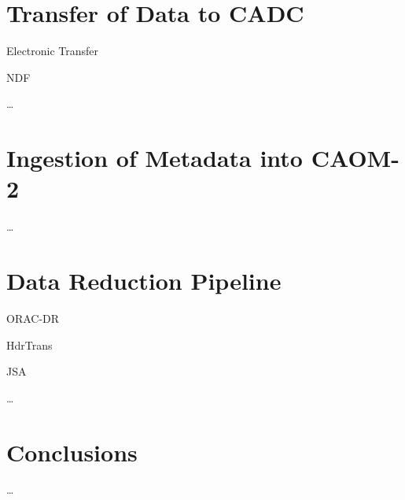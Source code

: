 \documentclass[11pt,twoside]{article}
\begin{document}
\section{Transfer of Data to CADC}

Electronic Transfer \citep{2005ASPC..347..647M}

NDF \citep{P91_adassxxiii}

\ldots

\section{Ingestion of Metadata into CAOM-2}

\ldots

\section{Data Reduction Pipeline}

ORAC-DR \citep{1999ASPC..172...11E,2008AN....329..295C}

HdrTrans \citep[section 2.2]{2008AN....329..295C}

JSA \citep{2011ASPC..442..203E}

\ldots

\section{Conclusions}

\ldots


\end{document}
